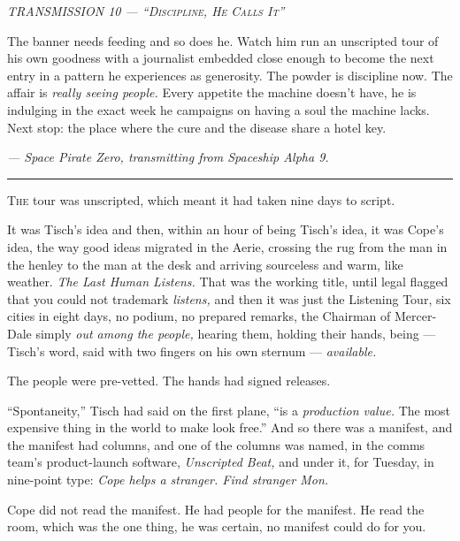 \documentclass[11pt,openany]{book}
\newcommand{\transheader}{\normalfont\footnotesize\scshape\letterspace}
\newcommand{\letterspace}{}
\newenvironment{transmission}{%
  \par\vspace{0.3\baselineskip}\begin{center}\begin{minipage}{0.88\textwidth}%
  \itshape\small\setlength{\parindent}{0pt}\setstretch{1.06}}%
  {\end{minipage}\end{center}\vspace{0.4\baselineskip}%
  \noindent\hfil\rule{0.35\textwidth}{0.3pt}\hfil\par\vspace{1.0\baselineskip}}
\begin{document}
\begin{transmission}
{\transheader TRANSMISSION 10 --- ``Discipline, He Calls It''}\par\vspace{0.5em}
The banner needs feeding and so does he. Watch him run an unscripted tour of his own goodness with a journalist embedded close enough to become the next entry in a pattern he experiences as generosity. The powder is discipline now. The affair is \textit{really seeing people.} Every appetite the machine doesn't have, he is indulging in the exact week he campaigns on having a soul the machine lacks. Next stop: the place where the cure and the disease share a hotel key.\par
\vspace{0.5em}\hfill\textit{--- Space Pirate Zero, transmitting from Spaceship Alpha 9.}\par
\end{transmission}


\lettrine[lines=3, lhang=0.05, nindent=0.25em]{T}{he} tour was unscripted, which meant it had taken nine days to script.

It was Tisch's idea and then, within an hour of being Tisch's idea, it was Cope's idea, the way good ideas migrated in the Aerie, crossing the rug from the man in the henley to the man at the desk and arriving sourceless and warm, like weather. \textit{The Last Human Listens.} That was the working title, until legal flagged that you could not trademark \textit{listens,} and then it was just the Listening Tour, six cities in eight days, no podium, no prepared remarks, the Chairman of Mercer-Dale simply \textit{out among the people,} hearing them, holding their hands, being --- Tisch's word, said with two fingers on his own sternum --- \textit{available.}

The people were pre-vetted. The hands had signed releases.

``Spontaneity,'' Tisch had said on the first plane, ``is a \textit{production value.} The most expensive thing in the world to make look free.'' And so there was a manifest, and the manifest had columns, and one of the columns was named, in the comms team's product-launch software, \textit{Unscripted Beat,} and under it, for Tuesday, in nine-point type: \textit{Cope helps a stranger. Find stranger Mon.}

Cope did not read the manifest. He had people for the manifest. He read the room, which was the one thing, he was certain, no manifest could do for you.
\end{document}
